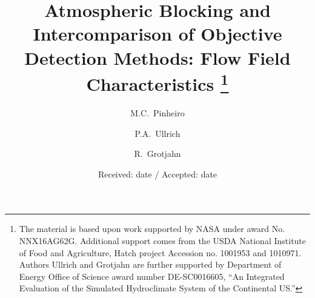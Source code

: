 \documentclass[smallextended]{svjour3}       %
\numberwithin{equation}{section}
\begin{document}
\title{Atmospheric Blocking and Intercomparison of Objective Detection Methods: Flow Field Characteristics
\thanks{The material is based upon work supported by NASA under award No. NNX16AG62G.  Additional support comes from the USDA National Institute of Food and Agriculture, Hatch project Accession no. 1001953 and 1010971. Authors Ullrich and Grotjahn are further supported by Department of Energy Office of Science award number DE-SC0016605, ``An Integrated Evaluation of the Simulated Hydroclimate System of the Continental US.''}
}
%



\author{M.C.~Pinheiro\and
        P.A.~Ullrich \and 
        R.~Grotjahn
}




\date{Received: date / Accepted: date}

\maketitle
\end{document}
